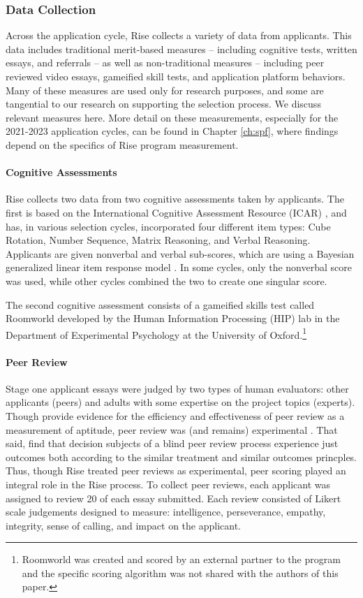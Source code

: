 \subsubsection{Data Collection}
Across the application cycle, Rise collects a variety of data from applicants. This data includes traditional merit-based measures – including cognitive tests, written essays, and referrals – as well as non-traditional measures – including peer reviewed video essays, gameified skill tests, and application platform behaviors. Many of these measures are used only for research purposes, and some are tangential to our research on supporting the selection process. We discuss relevant measures here. More detail on these measurements, especially for the 2021-2023 application cycles, can be found in Chapter \ref{ch:spf}, where findings depend on the specifics of Rise program measurement.

\paragraph{Cognitive Assessments}
Rise collects two data from two cognitive assessments taken by applicants. The first is based on the International Cognitive Assessment Resource (ICAR) \cite{condon2014international, subotic2020psychometric}, and has, in various selection cycles, incorporated four different item types: Cube Rotation, Number Sequence, Matrix Reasoning, and Verbal Reasoning. Applicants are given nonverbal and verbal sub-scores, which are using a Bayesian generalized linear item response model \cite{burkner2021bayesian}. In some cycles, only the nonverbal score was used, while other cycles combined the two to create one singular score.

The second cognitive assessment consists of a gameified skills test called Roomworld developed by the Human Information Processing (HIP) lab in the Department of Experimental Psychology at the University of Oxford.\footnote{Roomworld was created and scored by an external partner to the program and the specific scoring algorithm was not shared with the authors of this paper.}

\paragraph{Peer Review}
Stage one applicant essays were judged by two types of human evaluators: other applicants (peers) and adults with some expertise on the project topics (experts). Though \textcite{Anvari2021EffectivenessOP} provide evidence for the efficiency and effectiveness of peer review as a measurement of aptitude, peer review was (and remains) experimental \cite{Rahmatillah2022AnalyzingFA}. That said, \textcite{VanderSchee2022UsingCP} find that decision subjects of a blind peer review process experience just outcomes both according to the similar treatment and similar outcomes princples. Thus, though Rise treated peer reviews as experimental, peer scoring played an integral role in the Rise process. To collect peer reviews, each applicant was assigned to review 20 of each essay submitted. Each review consisted of Likert scale judgements designed to measure: intelligence, perseverance, empathy, integrity, sense of calling, and impact on the applicant.

